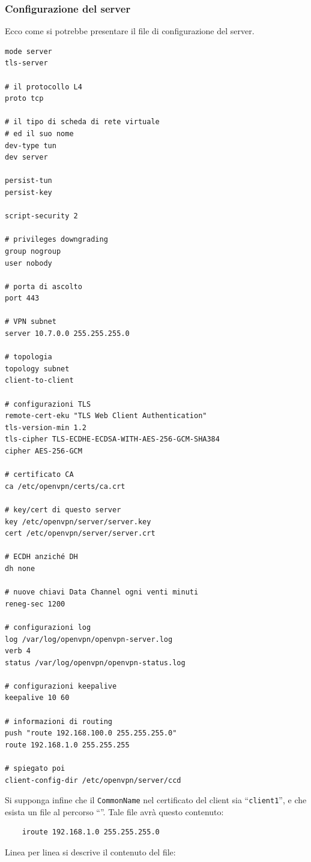 \subsubsection{Configurazione del server}
Ecco come si potrebbe presentare
il file di configurazione del server.
\begin{verbatim}
mode server
tls-server
	
# il protocollo L4
proto tcp
	
# il tipo di scheda di rete virtuale
# ed il suo nome
dev-type tun
dev server
	
persist-tun
persist-key

script-security 2
	
# privileges downgrading
group nogroup
user nobody
	
# porta di ascolto
port 443
	
# VPN subnet
server 10.7.0.0 255.255.255.0
	
# topologia
topology subnet
client-to-client
	
# configurazioni TLS
remote-cert-eku "TLS Web Client Authentication"
tls-version-min 1.2
tls-cipher TLS-ECDHE-ECDSA-WITH-AES-256-GCM-SHA384
cipher AES-256-GCM
	
# certificato CA
ca /etc/openvpn/certs/ca.crt
	
# key/cert di questo server
key /etc/openvpn/server/server.key
cert /etc/openvpn/server/server.crt
	
# ECDH anziché DH
dh none
	
# nuove chiavi Data Channel ogni venti minuti
reneg-sec 1200
	
# configurazioni log
log /var/log/openvpn/openvpn-server.log
verb 4
status /var/log/openvpn/openvpn-status.log
	
# configurazioni keepalive
keepalive 10 60
	
# informazioni di routing
push "route 192.168.100.0 255.255.255.0"
route 192.168.1.0 255.255.255
	
# spiegato poi
client-config-dir /etc/openvpn/server/ccd
\end{verbatim}
Si supponga infine che il \texttt{CommonName} nel certificato del client sia
``\texttt{client1}'', e che esista un file al percorso
``''. Tale file avrà questo contenuto:
\begin{verbatim}
	iroute 192.168.1.0 255.255.255.0
\end{verbatim}
Linea per linea si descrive il contenuto del file:

